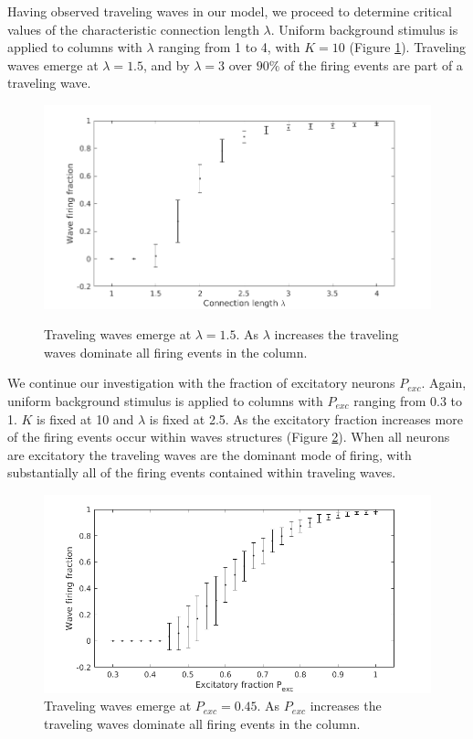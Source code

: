 \documentclass[a4paper,11pt]{article}
\begin{document}
Having observed traveling waves in our model, we proceed to determine critical values of the characteristic connection length $\lambda$.
Uniform background stimulus is applied to columns with $\lambda$ ranging from 1 to 4, with $K=10$ (Figure \ref{fig:lambda_fraction}).
Traveling waves emerge at $\lambda=1.5$, and by $\lambda=3$ over $90\%$ of the firing events are part of a traveling wave.
\begin{figure}[!ht]
 \caption{Traveling waves emerge at $\lambda=1.5$. As $\lambda$ increases the traveling waves dominate all firing events in the column.}
 \centering
   \includegraphics[width=\textwidth]{fig/LambdaWaveFraction}  
 \label{fig:lambda_fraction}
\end{figure}

\FloatBarrier

We continue our investigation with the fraction of excitatory neurons $P_{exc}$.
Again, uniform background stimulus is applied to columns with $P_{exc}$ ranging from 0.3 to 1.
$K$ is fixed at 10 and $\lambda$ is fixed at 2.5. 
As the excitatory fraction increases more of the firing events occur within waves structures (Figure \ref{fig:excitatory_effect}).
When all neurons are excitatory the traveling waves are the dominant mode of firing, with substantially all of the firing events contained within traveling waves. \\
\begin{figure}[!htb]
 \caption{Traveling waves emerge at $P_{exc}=0.45$. As $P_{exc}$ increases the traveling waves dominate all firing events in the column.}
 \label{fig:excitatory_effect}
 \centering
   \includegraphics[width=\textwidth]{fig/ExcitatoryWaves}
\end{figure}
\end{document}
